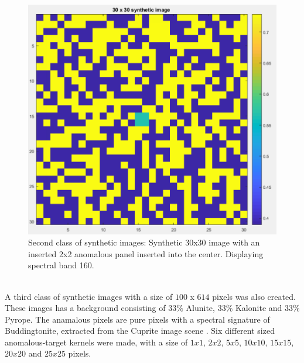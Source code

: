 \begin{figure}[H]
\centering
   \includegraphics[scale=0.4]{images/AD_testing/synthetic_images/30_30_anomaly_image.PNG}
  \caption{Second class of synthetic images: Synthetic 30x30 image with an inserted 2x2 anomalous panel inserted into the center. Displaying spectral band 160. } 
  \label{fig:synthetic_30_30}
\end{figure}


\\
A third class of synthetic images with a size of $100$ x $614$ pixels was also created. These images has a background consisting of $33\%$ Alunite, $33\%$ Kalonite and $33\%$ Pyrope. The anamalous pixels are pure pixels with a spectral signature of Buddingtonite, extracted from the Cuprite image scene \cite{ground_truth_cuprite}. Six different sized anomalous-target kernels were made, with a size of $1x1$, $2x2$, $5x5$, $10x10$, $15x15$, $20x20$ and $25x25$ pixels.




